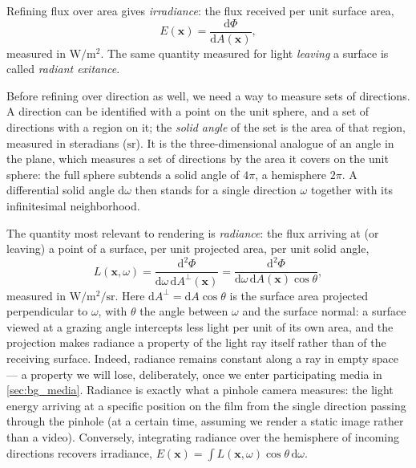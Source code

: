 Refining flux over area gives \emph{irradiance}: the flux received per unit surface area,
\begin{equation}
	E(\mathbf{x}) = \frac{\mathrm{d}\Phi}{\mathrm{d}A(\mathbf{x})},
\end{equation}
measured in $\mathrm{W/m^2}$. The same quantity measured for light \emph{leaving} a surface is called \emph{radiant exitance}.

Before refining over direction as well, we need a way to measure sets of directions. A direction can be identified with a point on the unit sphere, and a set of directions with a region on it; the \emph{solid angle} of the set is the area of that region, measured in steradians ($\mathrm{sr}$). It is the three-dimensional analogue of an angle in the plane, which measures a set of directions by the area it covers on the unit sphere: the full sphere subtends a solid angle of $4\pi$, a hemisphere $2\pi$. A differential solid angle $\mathrm{d}\omega$ then stands for a single direction $\omega$ together with its infinitesimal neighborhood.

The quantity most relevant to rendering is \emph{radiance}: the flux arriving at (or leaving) a point of a surface, per unit projected area, per unit solid angle,
\begin{equation}
	\label{eq:radiance}
	L(\mathbf{x}, \omega) = \frac{\mathrm{d}^2\Phi}{\mathrm{d}\omega \, \mathrm{d}A^{\perp}(\mathbf{x})} = \frac{\mathrm{d}^2\Phi}{\mathrm{d}\omega \, \mathrm{d}A(\mathbf{x}) \cos\theta},
\end{equation}
measured in $\mathrm{W/m^2/sr}$. Here $\mathrm{d}A^{\perp} = \mathrm{d}A\cos\theta$ is the surface area projected perpendicular to $\omega$, with $\theta$ the angle between $\omega$ and the surface normal: a surface viewed at a grazing angle intercepts less light per unit of its own area, and the projection makes radiance a property of the light ray itself rather than of the receiving surface. Indeed, radiance remains constant along a ray in empty space --- a property we will lose, deliberately, once we enter participating media in \cref{sec:bg_media}. Radiance is exactly what a pinhole camera measures: the light energy arriving at a specific position on the film from the single direction passing through the pinhole (at a certain time, assuming we render a static image rather than a video). Conversely, integrating radiance over the hemisphere of incoming directions recovers irradiance, $E(\mathbf{x}) = \int L(\mathbf{x}, \omega)\cos\theta \,\mathrm{d}\omega$.

